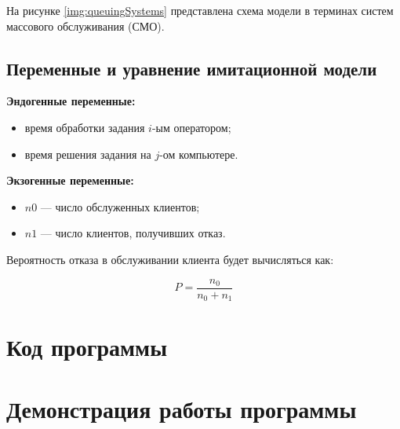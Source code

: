 \documentclass{bmstu}
\begin{document}
На рисунке \ref{img:queuingSystems} представлена схема модели в терминах систем массового обслуживания (СМО).


\section{Переменные и уравнение имитационной модели}

\textbf{Эндогенные переменные:}

\begin{itemize}
    \item время обработки задания $i$-ым оператором;
    \item время решения задания на $j$-ом компьютере.
\end{itemize}

\textbf{Экзогенные переменные:}

\begin{itemize}
    \item $n0$ — число обслуженных клиентов;
    \item $n1$ — число клиентов, получивших отказ.
\end{itemize}

Вероятность отказа в обслуживании клиента будет вычисляться как:

\begin{equation}
    P = \frac{n_0}{n_0 + n_1}
\end{equation}

\chapter{Код программы}


\chapter{Демонстрация работы программы}

\end{document}
